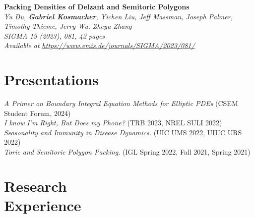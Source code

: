 \documentclass[resmargin, 10pt]{res} %
\begin{document}
\begin{resume}
\textbf{Packing Densities of Delzant and Semitoric Polygons} \\
\sl{Yu Du, \textbf{Gabriel Kosmacher}, Yichen Liu, Jeff Massman, Joseph Palmer, Timothy Thieme, Jerry Wu, Zheyu Zhang} \\
SIGMA 19 (2023), 081, 42 pages \\ Available at \href{https://www.emis.de/journals/SIGMA/2023/081/}{https://www.emis.de/journals/SIGMA/2023/081/}


\vspace{-8pt}
\section{Presentations} 

{\sl A Primer on Boundary Integral Equation Methods for Elliptic PDEs} (CSEM Student Forum, 2024) \\
{\sl I know I'm Right, But Does my Phone?} (TRB 2023, NREL SULI 2022)\\
{\sl Seasonality and Immunity in Disease Dynamics.} (UIC UMS 2022, UIUC URS 2022) \\
{\sl Toric and Semitoric Polygon Packing.} (IGL Spring 2022, Fall 2021, Spring 2021) 

\vspace{-8pt}
\section{Research \\ Experience}


\end{resume}
\end{document}
